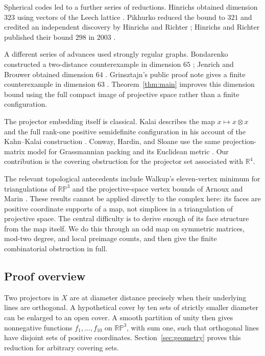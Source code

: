 Spherical codes led to a further series of reductions. Hinrichs obtained
dimension $323$ using vectors of the Leech lattice
\cite{Hinrichs2002}. Pikhurko reduced the bound to $321$ and credited
an independent discovery by Hinrichs and Richter \cite{Pikhurko2002};
Hinrichs and Richter published their bound $298$ in 2003
\cite{HinrichsRichter2003}.

A different series of advances used strongly regular graphs.
Bondarenko constructed a two-distance counterexample in dimension $65$
\cite{Bondarenko2014}; Jenrich and Brouwer obtained dimension $64$
\cite{JenrichBrouwer2014}. Grinsztajn's public proof note gives a
finite counterexample in dimension $63$ \cite{Grinsztajn2026}.
Theorem~\ref{thm:main} improves this dimension bound using the full
compact image of projective space rather than a finite configuration.

The projector embedding itself is classical. Kalai describes the map
$x\mapsto x\otimes x$ and the full rank-one positive semidefinite
configuration in his account of the Kahn--Kalai construction
\cite[Section~2.3]{Kalai2015}. Conway, Hardin, and Sloane use the
same projection-matrix model for Grassmannian packing and its Euclidean
metric \cite[Section~5, Theorem~2]{ConwayHardinSloane1996}.
Our contribution is the covering obstruction for the projector set
associated with $\mathbb R^4$.

The relevant topological antecedents include Walkup's eleven-vertex
minimum for triangulations of $\mathbb{RP}^3$
\cite[Theorem~3]{Walkup1970} and the projective-space vertex bounds
of Arnoux and Marin \cite{ArnouxMarin1991}. These results cannot be
applied directly to the complex here: its faces are positive coordinate
supports of a map, not simplices in a triangulation of projective space.
The central difficulty is to derive enough of its face structure from
the map itself. We do this through an odd map on symmetric matrices,
mod-two degree, and local preimage counts, and then give the finite
combinatorial obstruction in full.

\subsection*{Proof overview}
Two projectors in $X$ are at diameter distance precisely when their
underlying lines are orthogonal. A hypothetical cover by ten sets of
strictly smaller diameter can be enlarged to an open cover. A smooth
partition of unity then gives nonnegative functions $f_1,\ldots,f_{10}$
on $\mathbb{RP}^3$, with sum one, such that orthogonal lines have disjoint
sets of positive coordinates. Section~\ref{sec:geometry} proves this
reduction for arbitrary covering sets.


